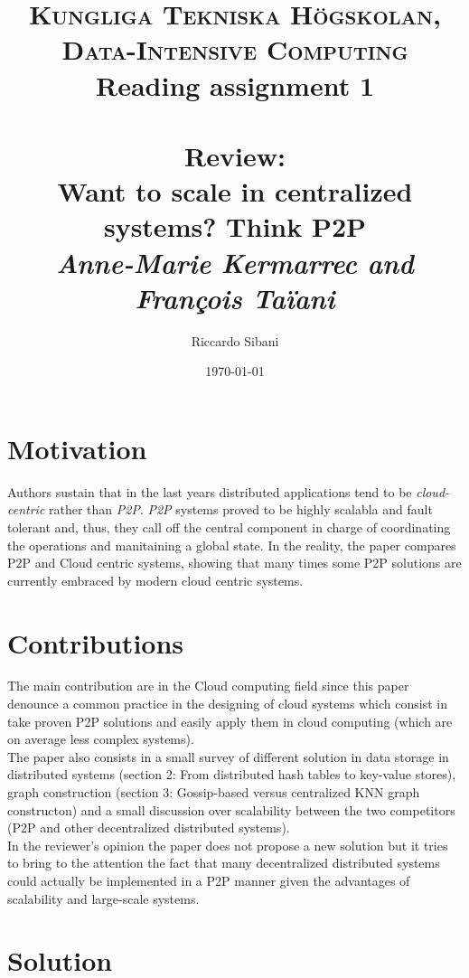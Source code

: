 \documentclass[paper=a4, fontsize=11pt]{scrartcl} %
\title{
\normalfont \normalsize
\textsc{Kungliga Tekniska Högskolan, Data-Intensive Computing} \\ [10pt] %
Reading assignment 1 \\ [25pt]
\horrule{0.5pt} \\[0.4cm] %
\huge Review:\\Want to scale in centralized systems? Think P2P \\ %
\vspace{5mm}
\normalsize \textit{Anne-Marie Kermarrec and François Taïani}
\horrule{2pt} \\[0.5cm] %
}
\author{Riccardo Sibani} %
\date{\normalsize\today} %
\numberwithin{equation}{section} %
\numberwithin{figure}{section} %
\numberwithin{table}{section} %
\begin{document}
\maketitle %


\section{Motivation}
Authors sustain that in the last years distributed applications tend to be \textit{cloud-centric} rather than \textit{P2P}.
\textit{P2P} systems proved to be highly scalabla and fault tolerant and, thus, they call off the central component in charge of coordinating the operations and manitaining a global state.
In the reality, the paper compares P2P and Cloud centric systems, showing that many times some P2P solutions are currently embraced by modern cloud centric systems.


\section{Contributions}
The main contribution are in the Cloud computing field since this paper denounce a common practice in the designing of cloud systems which consist in take proven P2P solutions and easily apply them in cloud computing (which are on average less complex systems). \\
The paper also consists in  a small survey of different solution in data storage in distributed systems (section 2: From distributed hash tables to key-value stores), graph construction (section 3: Gossip-based versus centralized KNN graph constructon) and a small discussion over scalability between the two competitors (P2P and other decentralized distributed systems). \\
In the reviewer's opinion the paper does not propose a new solution but it tries to bring to the attention the fact that many decentralized distributed systems could actually be implemented in a P2P manner given the advantages of scalability and large-scale systems.

\section{Solution}
\end{document}
